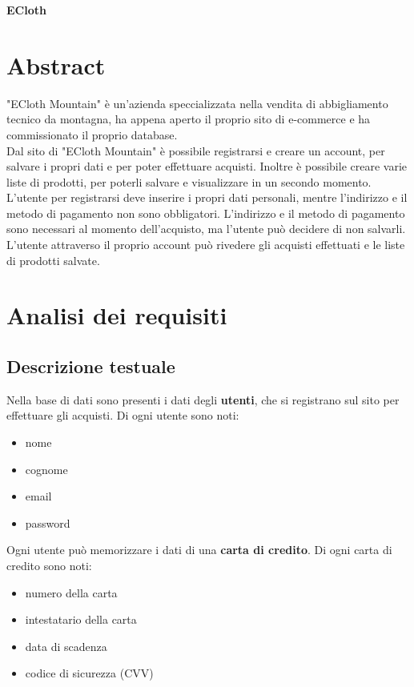 \documentclass[11pt]{article}
\begin{document}
\begin{center}
	\huge{\textbf{ECloth}}
\end{center}

\section{Abstract}
"ECloth Mountain" è un'azienda speccializzata nella vendita di abbigliamento 
tecnico da montagna, ha appena aperto il proprio sito di e-commerce e ha
commissionato il proprio database. \\
Dal sito di "ECloth Mountain" è possibile registrarsi e creare un account, per
salvare i propri dati e per poter effettuare acquisti. Inoltre è possibile
creare varie liste di prodotti, per poterli salvare e visualizzare in un secondo
momento. \\
L'utente per registrarsi deve inserire i propri dati personali, mentre
l'indirizzo e il metodo di pagamento non sono obbligatori. L'indirizzo e il
metodo di pagamento sono necessari al momento dell'acquisto, ma l'utente può 
decidere di non salvarli. L'utente attraverso il proprio account può rivedere 
gli acquisti effettuati e le liste di prodotti salvate.

\section{Analisi dei requisiti}

\subsection{Descrizione testuale}

Nella base di dati sono presenti i dati degli \textbf{utenti}, che si registrano
sul sito per effettuare gli acquisti. Di ogni utente sono noti: 

\begin{itemize}
	\item nome
	\item cognome
	\item email
	\item password
\end{itemize}

Ogni utente può memorizzare i dati di una \textbf{carta di credito}. Di ogni
carta di credito sono noti:

\begin{itemize}
	\item numero della carta
	\item intestatario della carta
	\item data di scadenza
	\item codice di sicurezza (CVV)
\end{itemize}
\end{document}
